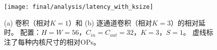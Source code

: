 \begin{figure}[htbp]
    \centering
    \texttt{[image: final/analysis/latency\_with\_ksize]}
    \caption{
        (a) 卷积（相对$K=1$）和
        (b) 逐通道卷积（相对$K=3$）的相对延时。
        配置：$H=W=56$，$C_{in}=C_{out}=32$，$K=3$，$S=1$。
        虚线标注了每种内核尺寸的相对OPs。
    }
    \label{fig:latency_with_ksize}
\end{figure}